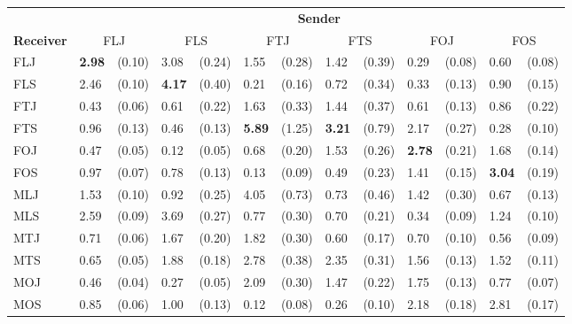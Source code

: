 
\begin{tabular}{ll@{\,\,\,}rl@{\,\,\,}rl@{\,\,\,}rl@{\,\,\,}rl@{\,\,\,}rl@{\,\,\,}r}
\toprule
    & \multicolumn{12}{c}{\textbf{Sender}} \\
    \cmidrule(lr){2- 13 }
\textbf{Receiver}
    & \multicolumn{2}{c}{\textnormal{FLJ}}
    & \multicolumn{2}{c}{\textnormal{FLS}}
    & \multicolumn{2}{c}{\textnormal{FTJ}}
    & \multicolumn{2}{c}{\textnormal{FTS}}
    & \multicolumn{2}{c}{\textnormal{FOJ}}
    & \multicolumn{2}{c}{\textnormal{FOS}} \\
    \cmidrule(lr){1-1}
    \cmidrule(lr){2-3}
    \cmidrule(lr){4-5}
    \cmidrule(lr){6-7}
    \cmidrule(lr){8-9}
    \cmidrule(lr){10-11}
    \cmidrule(lr){12-13}
    \textnormal{FLJ} & \textbf{2.98} & (0.10) & 3.08 & (0.24) & 1.55 & (0.28) & 1.42 & (0.39) & 0.29 & (0.08) & 0.60 & (0.08) \\
    \textnormal{FLS} & 2.46 & (0.10) & \textbf{4.17} & (0.40) & 0.21 & (0.16) & 0.72 & (0.34) & 0.33 & (0.13) & 0.90 & (0.15) \\
    \textnormal{FTJ} & 0.43 & (0.06) & 0.61 & (0.22) & 1.63 & (0.33) & 1.44 & (0.37) & 0.61 & (0.13) & 0.86 & (0.22) \\
    \textnormal{FTS} & 0.96 & (0.13) & 0.46 & (0.13) & \textbf{5.89} & (1.25) & \textbf{3.21} & (0.79) & 2.17 & (0.27) & 0.28 & (0.10) \\
    \textnormal{FOJ} & 0.47 & (0.05) & 0.12 & (0.05) & 0.68 & (0.20) & 1.53 & (0.26) & \textbf{2.78} & (0.21) & 1.68 & (0.14) \\
    \textnormal{FOS} & 0.97 & (0.07) & 0.78 & (0.13) & 0.13 & (0.09) & 0.49 & (0.23) & 1.41 & (0.15) & \textbf{3.04} & (0.19) \\
    \textnormal{MLJ} & 1.53 & (0.10) & 0.92 & (0.25) & 4.05 & (0.73) & 0.73 & (0.46) & 1.42 & (0.30) & 0.67 & (0.13) \\
    \textnormal{MLS} & 2.59 & (0.09) & 3.69 & (0.27) & 0.77 & (0.30) & 0.70 & (0.21) & 0.34 & (0.09) & 1.24 & (0.10) \\
    \textnormal{MTJ} & 0.71 & (0.06) & 1.67 & (0.20) & 1.82 & (0.30) & 0.60 & (0.17) & 0.70 & (0.10) & 0.56 & (0.09) \\
    \textnormal{MTS} & 0.65 & (0.05) & 1.88 & (0.18) & 2.78 & (0.38) & 2.35 & (0.31) & 1.56 & (0.13) & 1.52 & (0.11) \\
    \textnormal{MOJ} & 0.46 & (0.04) & 0.27 & (0.05) & 2.09 & (0.30) & 1.47 & (0.22) & 1.75 & (0.13) & 0.77 & (0.07) \\
    \textnormal{MOS} & 0.85 & (0.06) & 1.00 & (0.13) & 0.12 & (0.08) & 0.26 & (0.10) & 2.18 & (0.18) & 2.81 & (0.17) \\
\end{tabular}

